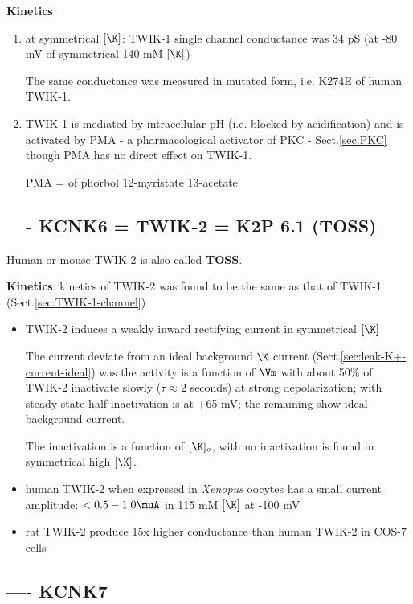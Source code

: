 {\bf Kinetics}
\begin{enumerate}
  \item at symmetrical $[\K]$: TWIK-1 single channel conductance was 34 pS (at
  -80 mV of symmetrical 140 mM $[\K]$)
  
The same conductance was measured in mutated form, i.e. K274E of human TWIK-1.

  \item TWIK-1 is mediated by intracellular pH (i.e. blocked by acidification)
  and is activated by PMA - a pharmacological activator of PKC -
  Sect.\ref{sec:PKC} though PMA has no direct effect on TWIK-1.
  
PMA = of phorbol 12-myristate 13-acetate

\end{enumerate}

\subsection{---- KCNK6 = TWIK-2 = K2P 6.1 (TOSS)}
\label{sec:TWIK-2-channel}
\label{sec:KCNK6}

Human or mouse TWIK-2 is also called {\bf TOSS}.

{\bf Kinetics}: kinetics of TWIK-2 was found to be the same as that of TWIK-1
(Sect.\ref{sec:TWIK-1-channel})
\begin{itemize}
  \item TWIK-2 induces a weakly inward rectifying current in symmetrical $[\K]$

The current deviate from an ideal background $\K$ current
(Sect.\ref{sec:leak-K+-current-ideal})
was the activity is a function of $\Vm$ with about 50\% of TWIK-2 inactivate
slowly ($\tau \approx 2$ seconds) at strong depolarization; with steady-state
half-inactivation is at +65 mV; the remaining show ideal background current.

The inactivation is a function of $[\K]_o$, with no inactivation is found in
symmetrical high $[\K]$.
 
  \item human TWIK-2 when expressed in {\it Xenopus} oocytes has a small current
  amplitude:
  $< 0.5 - 1.0 \muA$ in 115 mM $[\K]$ at -100 mV
  
  \item rat TWIK-2 produce 15x higher conductance than human TWIK-2 in COS-7
  cells
  
\end{itemize}


\subsection{---- KCNK7}
\label{sec:KCNK7}


